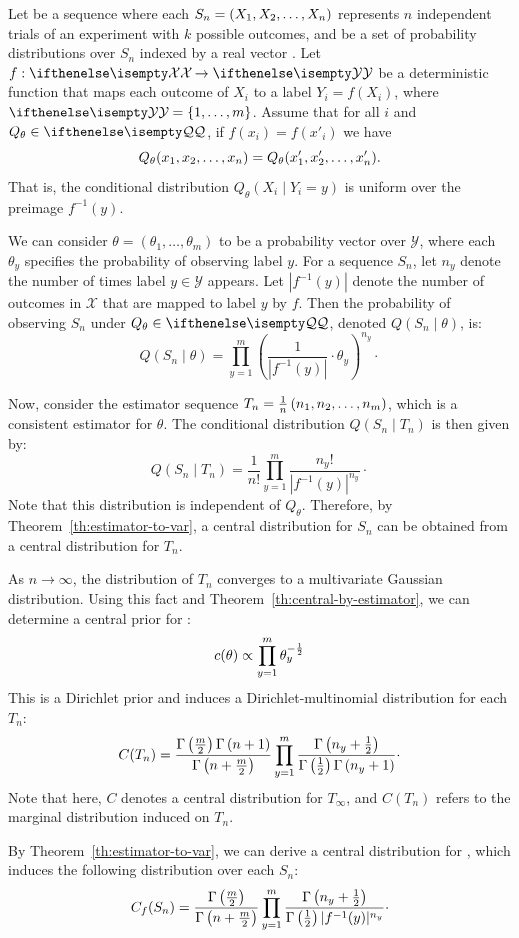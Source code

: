 \begin{example}
    \label{ex:fused-multinomial}
    \newcommand{\prodm}{\prod_{y=1}^m}
    \newcommand{\Qt}{Q_{\theta}}
    Let  be a sequence where each $S_n = (\seqExp{X})$ represents $n$ independent trials of an
    experiment with $k$ possible outcomes,
    and \setQ be a set of probability distributions over $S_n$ indexed by a real vector \paramVal.
    Let $f: \set{X} \to \set{Y}$ be a deterministic function that maps each outcome of $X_i$
    to a label $Y_i = f(X_i)$, where $\set{Y} = \{1, \dots, m\}$.
    Assume that for all $i$ and $\Qt \in \setQ$, if $f(x_i) = f(x'_i)$ we have \[\Qt(\seqExp{x}) = \Qt(\seqExp{x'}).\]
    That is, the conditional distribution $\Qt(X_i \mid Y_i = y)$ is uniform over the preimage $f^{-1}(y)$.

    We can consider $\theta = (\theta_1, \dots, \theta_m)$ to be a probability vector over $\mathcal{Y}$,
    where each $\theta_y$ specifies the probability of observing label $y$.
    For a sequence $S_n$, let $n_y$ denote the number of times label $y \in \mathcal{Y}$ appears.
    Let $|f^{-1}(y)|$ denote the number of outcomes in $\mathcal{X}$ that are mapped to label $y$ by $f$.
    Then the probability of observing $S_n$ under $\Qt \in \setQ$, denoted $Q(S_n \mid \theta)$, is:
    \[
        Q(S_n \mid \theta) = \prodm \left( \frac{1}{|f^{-1}(y)|} \cdot \theta_y \right)^{n_y} \cdot
    \]

    Now, consider the estimator sequence $T_n = \frac{1}{n} \left( \seqExp[m]{n} \right)$, which is a consistent
    estimator for $\theta$.
    The conditional distribution $Q(S_n \mid T_n)$ is then given by:
    \[
        Q(S_n \mid T_n) = \frac{1}{n!} \prodm \frac{n_y!}{|f^{-1}(y)|^{n_y}} \cdot
    \]
    Note that this distribution is independent of $Q_\theta$.
    Therefore, by Theorem~\ref{th:estimator-to-var}, a central distribution for $S_n$ can be obtained from a central distribution
    for $T_n$.

    As $n \to \infty$, the distribution of $T_n$ converges to a multivariate Gaussian distribution.
    Using this fact and Theorem~\ref{th:central-by-estimator}, we can determine a central prior for :
    \[
        c(\theta) \propto \prodm \theta_y^{-\hf}
    \]
    This is a Dirichlet prior and induces a Dirichlet-multinomial distribution for each $T_n$:
    \[
        C(T_n) = \frac{\gm{\hf[m]}\gm{n+1}}{\gm{n + \hf[m]}}
        \prodm \frac{\gm{n_y + \hf}}{\gm{\hf}\gm{n_y+1}} \cdot
    \]
    Note that here, $C$ denotes a central distribution for $T_\infty$, and $C(T_n)$ refers to the marginal
    distribution induced on $T_n$.

    By Theorem~\ref{th:estimator-to-var}, we can derive a central distribution for , which induces the
    following distribution over each $S_n$:
    \[
        C_f(S_n) = \frac{\gm{\hf[m]}}{\gm{n + \hf[m]}}
        \prodm \frac{\gm{n_y + \hf}}{\gm{\hf} |f^{-1}(y)|^{n_y}} \cdot
    \]
\end{example}
